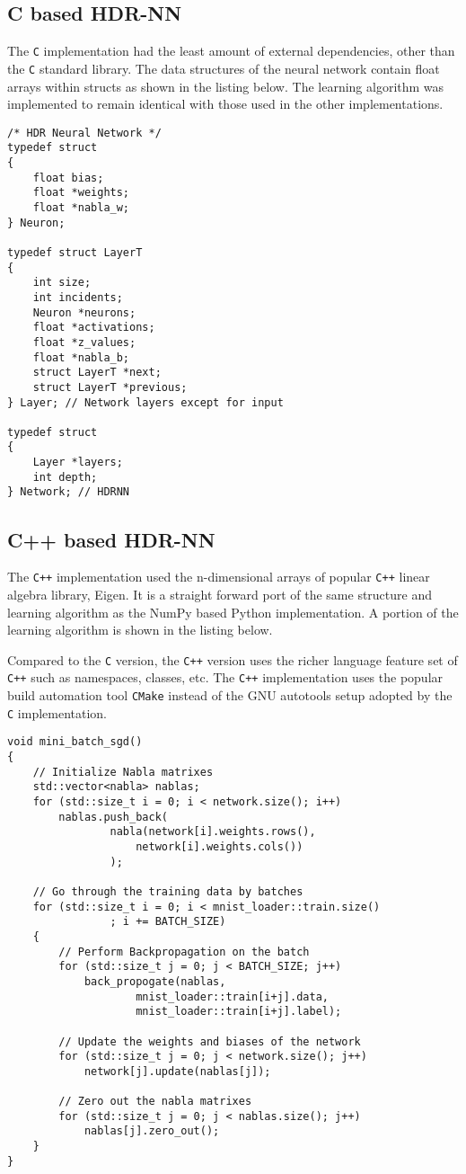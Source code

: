 \subsection{C based HDR-NN}

The \texttt{C} implementation had the least amount of external dependencies, other than the \texttt{C} standard library. The data structures of the neural network contain float arrays within structs as shown in the listing below. The learning algorithm was implemented to remain identical with those used in the other implementations.

\begin{verbatim}
/* HDR Neural Network */
typedef struct
{
	float bias;
	float *weights;
	float *nabla_w;
} Neuron;

typedef struct LayerT
{
	int size;
	int incidents;
	Neuron *neurons;
	float *activations;
	float *z_values;
	float *nabla_b;
	struct LayerT *next;
	struct LayerT *previous;
} Layer; // Network layers except for input

typedef struct
{
	Layer *layers;
	int depth;
} Network; // HDRNN
\end{verbatim}

\subsection{C++ based HDR-NN}

The \texttt{C++} implementation used the n-dimensional arrays of popular \texttt{C++} linear algebra library, Eigen. It is a straight forward port of the same structure and learning algorithm as the NumPy based Python implementation. A portion of the learning algorithm is shown in the listing below.

Compared to the \texttt{C} version, the \texttt{C++} version uses the richer language feature set of \texttt{C++} such as namespaces, classes, etc. The \texttt{C++} implementation uses the popular build automation tool \texttt{CMake} instead of the GNU autotools setup adopted by the \texttt{C} implementation.

\begin{verbatim}
void mini_batch_sgd()
{
	// Initialize Nabla matrixes
	std::vector<nabla> nablas;
	for (std::size_t i = 0; i < network.size(); i++)
		nablas.push_back(
				nabla(network[i].weights.rows(),
					network[i].weights.cols())
				);

	// Go through the training data by batches
	for (std::size_t i = 0; i < mnist_loader::train.size()
				; i += BATCH_SIZE)
	{
		// Perform Backpropagation on the batch
		for (std::size_t j = 0; j < BATCH_SIZE; j++)
			back_propogate(nablas,
					mnist_loader::train[i+j].data,
					mnist_loader::train[i+j].label);

		// Update the weights and biases of the network
		for (std::size_t j = 0; j < network.size(); j++)
			network[j].update(nablas[j]);

		// Zero out the nabla matrixes
		for (std::size_t j = 0; j < nablas.size(); j++)
			nablas[j].zero_out();
	}
}
\end{verbatim}
